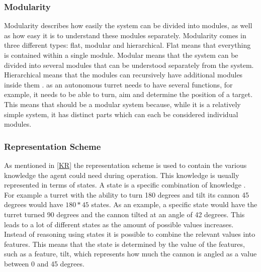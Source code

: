 \subsubsection{Modularity}
Modularity describes how easily the system can be divided into modules, as well
as how easy it is to understand these modules separately. Modularity comes in
three different types: flat, modular and hierarchical. Flat means that
everything is contained within a single module. Modular means that the system can be divided into several modules that can be understood separately from the system.
Hierarchical means that the modules can recursively have additional modules
inside them \citep[ch.1.5.1]{MIBook}. \name as an autonomous turret needs to
have several functions, for example, it needs to be able to turn, aim and
determine the position of a target. This means that \name should be a modular
system because, while it is a relatively simple system, it has distinct parts
which can each be considered individual modules.

\subsubsection{Representation Scheme}
As mentioned in \autoref{KR} the representation scheme is used to contain the
various knowledge the agent could need during operation. This knowledge is
usually represented in terms of states. A state is a specific combination of
knowledge \citep[ch.1.5.2]{MIBook}. For example a turret with the ability to
turn 180 degrees and tilt its cannon 45 degrees would have $180 * 45$ states. As
an example, a specific state would have the turret turned 90 degrees and the
cannon tilted at an angle of 42 degrees. This leads to a lot of different states
as the amount of possible values increases. Instead of reasoning using states it
is possible to combine the relevant values into features. This means that the
state is determined by the value of the features, such as a feature, tilt,
which represents how much the cannon is angled as a value between 0 and
45 degrees.

